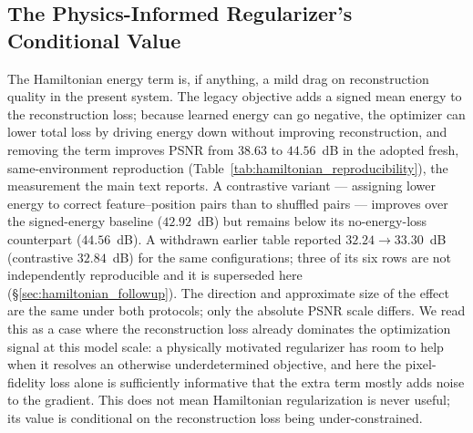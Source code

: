 \documentclass[11pt]{article}
\begin{document}
\subsection{The Physics-Informed Regularizer's Conditional Value}
The Hamiltonian energy term is, if anything, a mild drag on reconstruction quality in the present system. The legacy objective adds a signed mean energy to the reconstruction loss; because learned energy can go negative, the optimizer can lower total loss by driving energy down without improving reconstruction, and removing the term improves PSNR from $38.63$ to $44.56$~dB in the adopted fresh, same-environment reproduction (Table~\ref{tab:hamiltonian_reproducibility}), the measurement the main text reports. A contrastive variant --- assigning lower energy to correct feature--position pairs than to shuffled pairs --- improves over the signed-energy baseline ($42.92$~dB) but remains below its no-energy-loss counterpart ($44.56$~dB). A withdrawn earlier table reported $32.24\rightarrow33.30$~dB (contrastive $32.84$~dB) for the same configurations; three of its six rows are not independently reproducible and it is superseded here (\S\ref{sec:hamiltonian_followup}). The direction and approximate size of the effect are the same under both protocols; only the absolute PSNR scale differs. We read this as a case where the reconstruction loss already dominates the optimization signal at this model scale: a physically motivated regularizer has room to help when it resolves an otherwise underdetermined objective, and here the pixel-fidelity loss alone is sufficiently informative that the extra term mostly adds noise to the gradient. This does not mean Hamiltonian regularization is never useful; its value is conditional on the reconstruction loss being under-constrained.
\end{document}
